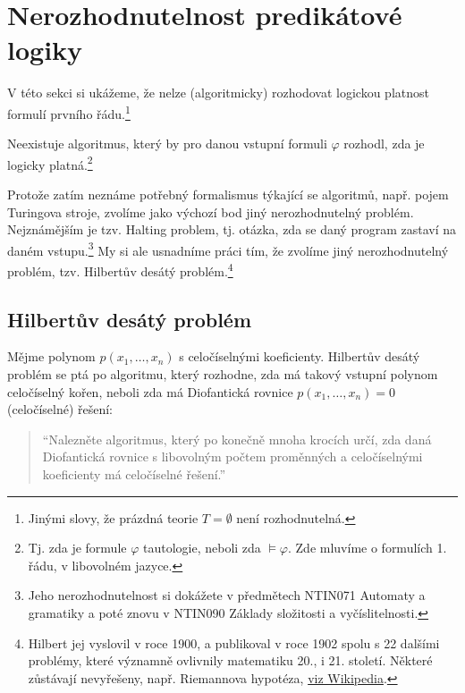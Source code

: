 
\section{Nerozhodnutelnost predikátové logiky}
    
V této sekci si ukážeme, že nelze (algoritmicky) rozhodovat logickou platnost formulí prvního řádu.\footnote{Jinými slovy, že prázdná teorie $T=\emptyset$ není rozhodnutelná.}

\begin{theorem}\label{theorem:undecidability-of-predicate-logic}
Neexistuje algoritmus, který by pro danou vstupní formuli $\varphi$ rozhodl, zda je logicky platná.\footnote{Tj. zda je formule $\varphi$ tautologie, neboli zda $\models\varphi$. Zde mluvíme o formulích 1. řádu, v libovolném jazyce.}
\end{theorem}

Protože zatím neznáme potřebný formalismus týkající se algoritmů, např. pojem Turingova stroje, zvolíme jako výchozí bod jiný \alert{nerozhodnutelný problém}. Nejznámějším je tzv. \alert{Halting problem}, tj. otázka, zda se daný program zastaví na daném vstupu.\footnote{Jeho nerozhodnutelnost si dokážete v předmětech NTIN071 Automaty a gramatiky a poté znovu v NTIN090 Základy složitosti a vyčíslitelnosti.} My si ale usnadníme práci tím, že zvolíme jiný nerozhodnutelný problém, tzv. \alert{Hilbertův desátý problém}.\footnote{Hilbert jej vyslovil v roce 1900, a publikoval v roce 1902 spolu s 22 dalšími problémy, které významně ovlivnily matematiku 20., i 21. století. Některé zůstávají nevyřešeny, např. Riemannova hypotéza, \href{https://en.wikipedia.org/wiki/Logic_in_computer_science}{viz Wikipedia}.}

\subsection{Hilbertův desátý problém}

Mějme polynom $p(x_1,\dots,x_n)$ s celočíselnými koeficienty. Hilbertův desátý problém se ptá po algoritmu, který rozhodne, zda má takový vstupní polynom celočíselný kořen, neboli zda má \alert{Diofantická rovnice}  $p(x_1,\dots,x_n)=0$ (celočíselné) řešení:
\begin{quote}
    ``Nalezněte algoritmus, který po konečně mnoha krocích určí, zda daná Diofantická rovnice s libovolným počtem proměnných a
    celočíselnými koeficienty má celočíselné řešení.''
\end{quote}

